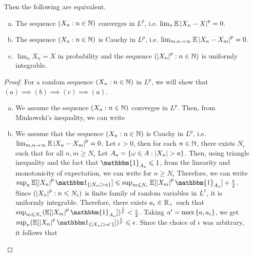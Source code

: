 \documentclass[letterpaper,10pt,english]{article}
\begin{document}
{\begin{thm}
Then the following are equivalent. 
\begin{enumerate}[(a)]
\item The  sequence $(X_n: n\in \mathbb{N})$ converges in $L^p$, i.e. $\lim_n\mathbb{E}\left\lvert X_n -  X\right\rvert^p = 0$.
\item The sequence  $(X_n: n\in \mathbb{N})$ is Cauchy in $L^p$, i.e. $\lim_{m,n \to \infty}\mathbb{E}\left\lvert X_n-X_m\right\rvert^p = 0$. 
\item $\lim_nX_n = X$ in probability and the sequence $(\left\lvert X_n\right\rvert^p: n \in \mathbb{N})$ is uniformly integrable.  
\end{enumerate}
\end{thm}
\begin{proof} 
For a random sequence $(X_n: n\in \mathbb{N})$ in $L^p$, 
we will show that $(a)\implies (b) \implies (c) \implies (a)$. 
\begin{enumerate}[(a)]
\item[$(a)\implies (b):$]  We assume the sequence $(X_n: n\in \mathbb{N})$ converges in $L^p$. 
Then, from Minkowski's inequality, we can write 
\item[$(b) \implies (c):$] We assume that the sequence  $(X_n: n\in \mathbb{N})$ is Cauchy in $L^p$, i.e. $\lim_{m,n \to \infty}\mathbb{E}\left\lvert X_n-X_m\right\rvert^p = 0$.  
Let $\epsilon > 0$, then for each $n \in \mathbb{N}$, there exists $N_\epsilon$ such that for all $n,m \ge N_\epsilon$
Let $A_a =\left\{\omega \in A: \left\lvert X_n\right\rvert > a\right\}$. 
Then, using triangle inequality and the fact that $\mathbbm{1}_{A_a} \le 1$, from the linearity and monotonicity of expectation, 
we can write for $n \ge N_\epsilon$ 
Therefore, we can write $\sup_n \E[\abs{X_n}^p\SetIn{\abs{X_n} > a}]  \le \sup_{m \le N_\epsilon}\E[\abs{X_m}^p\mathbbm{1}_{A_a}]+ \frac{\epsilon}{2}$. 
Since $(\left\lvert X_n\right\rvert^p: n\leqslant N_\epsilon)$ is finite family of random variables in $L^1$, it is uniformly integrable. 
Therefore, there exists $a_\epsilon \in \mathbb{R}_+$ such that $\sup_{m \le N_\epsilon}(\E[\abs{X_m}^p\mathbbm{1}_{A_a}])^{\frac{1}{p}} < \frac{\epsilon}{2}$. 
Taking $a' = \max\left\{a, a_\epsilon\right\}$, we get $\sup_n (\E[\abs{X_n}^p\SetIn{\abs{X_n} > a'}])^{\frac{1}{p}} \le \epsilon$. 
Since the choice of $\epsilon$ was arbitrary, it follows that 
\end{enumerate}
\end{proof}}
\end{document}
